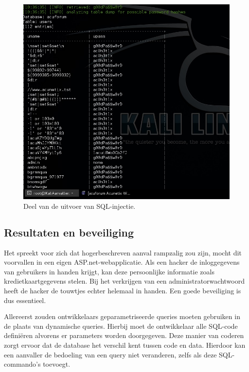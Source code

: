 \documentclass[pdftex,a4paper,12pt]{report}
\begin{document}
\begin{figure}[H]
\begin{center}
\includegraphics[scale=0.60]{img/SQLData}
\end{center}
\caption{Deel van de uitvoer van SQL-injectie.}
\label{img:SQLData}
\end{figure}

\subsection{Resultaten en beveiliging}
Het spreekt voor zich dat hogerbeschreven aanval rampzalig zou zijn, mocht dit voorvallen in een eigen ASP.net-webapplicatie. Als een hacker de inloggegevens van gebruikers in handen krijgt, kan deze persoonlijke informatie zoals kredietkaartgegevens stelen. Bij het verkrijgen van een administratorwachtwoord heeft de hacker de touwtjes echter helemaal in handen. Een goede beveiliging is dus essentieel. \newline

Allereerst zouden ontwikkelaars geparametriseerde queries moeten gebruiken in de plaats van dynamische queries. Hierbij moet de ontwikkelaar alle SQL-code definiëren alvorens er parameters worden doorgegeven. Deze manier van coderen zorgt ervoor dat de database het verschil kent tussen code en data. Hierdoor kan een aanvaller de bedoeling van een query niet veranderen, zelfs als deze SQL-commando's toevoegt. \citep{Wichers2013}
\end{document}
